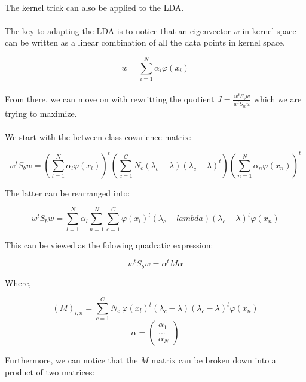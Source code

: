 \paragraph{}
The kernel trick can also be applied to the LDA.

\paragraph{}
The key to adapting the LDA is to notice that an eigenvector $w$ in kernel space can be written as a
linear combination of all the data points in kernel space.

$$ w = \sum_{i=1}^N \alpha_i \varphi(x_i)$$

\paragraph{}
From there, we can move on with rewritting the quotient $J = \frac{w^tS_bw}{w^tS_ww}$ which we are
trying to maximize.

\paragraph{}
We start with the between-class covarience matrix:

$$w^tS_bw = \left( \sum_{l=1}^N \alpha_l \varphi(x_l)\right)^t
            \left( \sum_{c=1}^C N_c(\lambda_c - \lambda)(\lambda_c - \lambda)^t\right)
            \left( \sum_{n=1}^N \alpha_n \varphi(x_n)\right)^t $$

The latter can be rearranged into:

$$w^tS_bw = \sum_{l=1}^N\alpha_l \sum_{n=1}^N \sum_{c =1}^C 
                \varphi(x_l)^t(\lambda_c - lambda)(\lambda_c - \lambda)^t\varphi(x_n)$$

This can be viewed as the folowing quadratic expression:

$$w^tS_bw = \alpha^tM\alpha$$

Where,

$$ (M)_{l,n} = \sum_{c=1}^C N_c ~\varphi(x_l)^t (\lambda_c - \lambda)(\lambda_c -\lambda)^t
\varphi(x_n) $$
$$\alpha = \left( \begin{array}{c}
                                \alpha_1 \\
                                ... \\
                                \alpha_N
                  \end{array}  \right) $$

Furthermore, we can notice that the $M$ matrix can be broken down into a product of two matrices:


